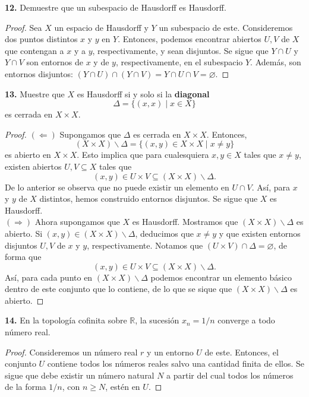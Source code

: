 \documentclass{article}
\begin{document}
\begin{mybox}
	\textbf{12. } Demuestre que un subespacio de Hausdorff es Hausdorff. 
\end{mybox}	
\begin{proof}
	Sea $X$ un espacio de Hausdorff y $Y$ un subespacio de este. Consideremos dos puntos distintos $x$ y $y$ en $Y$. Entonces, podemos encontrar abiertos $U, V$ de $X$ que contengan a $x$ y a $y$, respectivamente, y sean disjuntos. Se sigue que $Y \cap U$ y $Y \cap V$ son entornos de $x$ y de $y$, respectivamente, en el subespacio $Y$. Además, son entornos disjuntos: $(Y \cap U) \cap (Y \cap V) = Y \cap U \cap V = \varnothing.$
\end{proof}

\begin{mybox}
	\textbf{13. } Muestre que $X$ es Hausdorff si y solo si la \textbf{diagonal}
	$$ \Delta = \{ (x, x) \mid x \in X \} $$
	es cerrada en $ X \times X$.
\end{mybox}	
\begin{proof}
	$(\Leftarrow)$ Supongamos que $\Delta$ es cerrada en $X \times X$. Entonces, 
	$$ \left( X \times X \right)  \backslash \Delta = \{ (x, y) \in X \times X \mid x \neq y \}$$ 
es abierto en $X \times X$. Esto implica que para cualesquiera $x, y \in X$ tales que $x \neq y$, existen abiertos $U, V \subseteq X$ tales que
$$ (x, y) \in U \times V \subseteq  \left( X \times X \right)  \backslash \Delta. $$
De lo anterior se observa que no puede existir un elemento en $U \cap V$. Así, para $x$ y $y$ de $X$ distintos, hemos construido entornos disjuntos. Se sigue que $X$ es Hausdorff.\\
$(\Rightarrow)$ Ahora supongamos que $X$ es Hausdorff. Mostramos que $\left( X \times X \right)  \backslash \Delta$ es abierto. Si $(x, y) \in \left( X \times X \right)  \backslash \Delta$, deducimos que $x \neq y$ y que existen entornos disjuntos $U, V$ de $x$ y $y$, respectivamente. Notamos que $ (U \times V) \cap \Delta = \varnothing$, de forma que 
$$(x, y) \in U \times V \subseteq \left( X \times X \right)  \backslash \Delta.$$ 
Así, para cada punto en $\left( X \times X \right)  \backslash \Delta$ podemos encontrar un elemento básico dentro de este conjunto que lo contiene, de lo que se sique que $\left( X \times X \right)  \backslash \Delta$ es abierto. 
\end{proof}

\begin{mybox}
	\textbf{14. } En la topología cofinita sobre $\mathbb{R}$, la sucesión $x_{n} = 1/n$ converge a todo número real. 
\end{mybox}	
\begin{proof}
	Consideremos un número real $r$ y un entorno $U$ de este. Entonces, el conjunto $U$ contiene todos los números reales salvo una cantidad finita de ellos. Se sigue que debe existir un número natural $N$ a partir del cual todos los números de la forma $1/n$, con $n \geq N$, estén en $U$.  
\end{proof}
\end{document}
